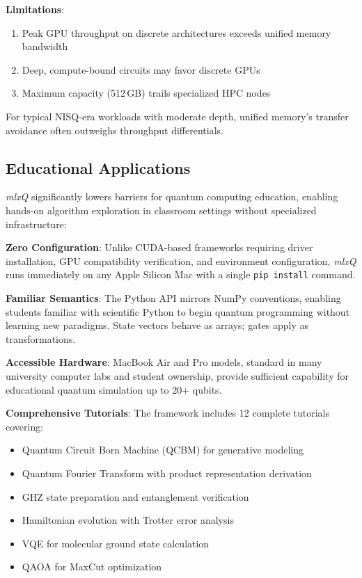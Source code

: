 \documentclass[runningheads]{llncs}
\newcommand{\mlxquantum}{\textit{mlxQ}\xspace}
\begin{document}
\textbf{Limitations}:
\begin{enumerate}
    \item Peak GPU throughput on discrete architectures exceeds unified memory bandwidth
    \item Deep, compute-bound circuits may favor discrete GPUs
    \item Maximum capacity (512\,GB) trails specialized HPC nodes
\end{enumerate}

For typical NISQ-era workloads with moderate depth, unified memory's transfer avoidance often outweighs throughput differentials.

\subsection{Educational Applications}

\mlxquantum significantly lowers barriers for quantum computing education, enabling hands-on algorithm exploration in classroom settings without specialized infrastructure:

\textbf{Zero Configuration}: Unlike CUDA-based frameworks requiring driver installation, GPU compatibility verification, and environment configuration, \mlxquantum runs immediately on any Apple Silicon Mac with a single \texttt{pip install} command.

\textbf{Familiar Semantics}: The Python API mirrors NumPy conventions, enabling students familiar with scientific Python to begin quantum programming without learning new paradigms. State vectors behave as arrays; gates apply as transformations.

\textbf{Accessible Hardware}: MacBook Air and Pro models, standard in many university computer labs and student ownership, provide sufficient capability for educational quantum simulation up to 20+ qubits.

\textbf{Comprehensive Tutorials}: The framework includes 12 complete tutorials covering:
\begin{itemize}
    \item Quantum Circuit Born Machine (QCBM) for generative modeling
    \item Quantum Fourier Transform with product representation derivation
    \item GHZ state preparation and entanglement verification
    \item Hamiltonian evolution with Trotter error analysis
    \item VQE for molecular ground state calculation
    \item QAOA for MaxCut optimization
\end{itemize}
\end{document}
